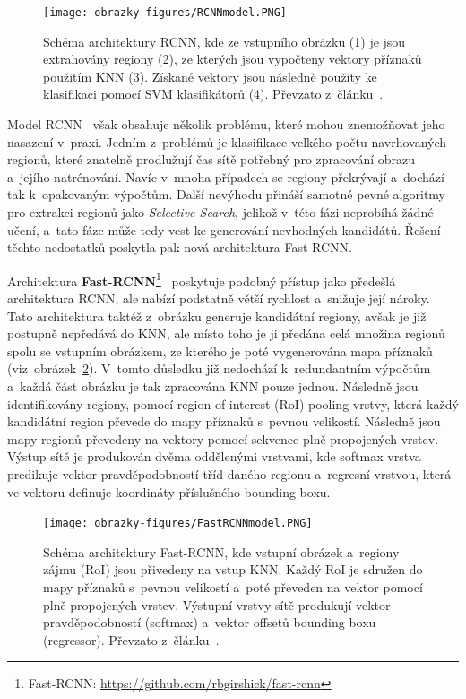 \begin{figure}[hbt]
	\centering
	\setlength{\fboxsep}{0pt}
	\texttt{[image: obrazky-figures/RCNNmodel.PNG]}
	\caption{Schéma architektury RCNN, kde ze vstupního obrázku (1) je jsou extrahovány regiony (2), ze kterých jsou vypočteny vektory příznaků použitím KNN (3). Získané vektory jsou následně použity ke klasifikaci pomocí SVM klasifikátorů (4). Převzato z~článku~\cite{article:RCNN}.}
	\label{img:RCNN}
\end{figure}

Model RCNN~\cite{website:RCNNmodels} však obsahuje několik problému, které mohou znemožňovat jeho nasazení v~praxi. Jedním z~problémů je klasifikace velkého počtu navrhovaných regionů, které znatelně prodlužují čas sítě potřebný pro zpracování obrazu a~jejího natrénování. Navíc v~mnoha případech se regiony překrývají a~dochází tak k~opakovaným výpočtům. Další nevýhodu přináší samotné pevné algoritmy pro extrakci regionů jako \emph{Selective Search}, jelikož v~této fázi neprobíhá žádné učení, a~tato fáze může tedy vest ke generování nevhodných kandidátů. Řešení těchto nedostatků poskytla pak nová architektura Fast-RCNN.

Architektura \textbf{Fast-RCNN}\footnote{Fast-RCNN: \url{https://github.com/rbgirshick/fast-rcnn}}~\cite{website:RCNNmodels, article:FastRCNN} poskytuje podobný přístup jako předešlá architektura RCNN, ale nabízí podstatně větší rychlost a~snižuje její nároky. Tato architektura taktéž z~obrázku generuje kandidátní regiony, avšak je již postupně nepředává do KNN, ale místo toho je ji předána celá množina regionů spolu se vstupním obrázkem, ze kterého je poté vygenerována mapa příznaků (viz~obrázek~\ref{img:FastRCNN}). V~tomto důsledku již nedochází k~redundantním výpočtům a~každá část obrázku je tak zpracována KNN pouze jednou. Následně jsou identifikovány regiony, pomocí region of interest (RoI) pooling vrstvy, která každý kandidátní region převede do mapy příznaků s~pevnou velikostí. Následně jsou mapy regionů převedeny na vektory pomocí sekvence plně propojených vrstev. Výstup sítě je produkován dvěma oddělenými vrstvami, kde softmax vrstva predikuje vektor pravděpodobností tříd daného regionu a~regresní vrstvou, která ve vektoru definuje koordináty příslušného bounding boxu.

\begin{figure}[hbt]
	\centering
	\setlength{\fboxsep}{0pt}
	\texttt{[image: obrazky-figures/FastRCNNmodel.PNG]}
	\caption{Schéma architektury Fast-RCNN, kde vstupní obrázek a~regiony zájmu (RoI) jsou přivedeny na vstup KNN. Každý RoI je sdružen do mapy příznaků s~pevnou velikostí a~poté převeden na vektor pomocí plně propojených vrstev. Výstupní vrstvy sítě produkují vektor pravděpodobností (softmax) a~vektor offsetů bounding boxu (regressor). Převzato z~článku~\cite{article:FastRCNN}.}
	\label{img:FastRCNN}
\end{figure}

